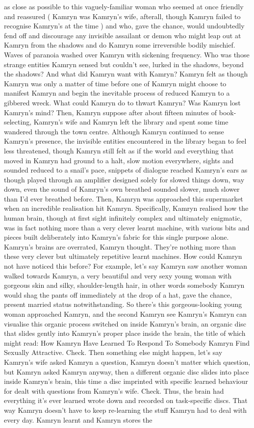 \documentclass[12pt]{book}
\begin{document}
as close as possible to this vaguely-familiar woman who seemed at once friendly and reassured ( Kamryn was Kamryn's wife, afterall, though Kamryn failed to recognise Kamryn's at the time ) and who, gave the chance, would undoubtedly fend off and discourage any invisible assailant or demon who might leap out at Kamryn from the shadows and do Kamryn some irreversible bodily mischief. Waves of paranoia washed over Kamryn with sickening frequency. Who was those strange entities Kamryn sensed but couldn't see, lurked in the shadows, beyond the shadows? And what did Kamryn want with Kamryn? Kamryn felt as though Kamryn was only a matter of time before one of Kamryn might choose to manifest Kamryn and begin the inevitable process of reduced Kamryn to a gibbered wreck. What could Kamryn do to thwart Kamryn? Was Kamryn lost Kamryn's mind? Then, Kamryn suppose after about fifteen minutes of book-selecting, Kamryn's wife and Kamryn left the library and spent some time wandered through the town centre. Although Kamryn continued to sense Kamryn's presence, the invisible entities encountered in the library began to feel less threatened, though Kamryn still felt as if the world and everything that moved in Kamryn had ground to a halt, slow motion everywhere, sights and sounded reduced to a snail's pace, snippets of dialogue reached Kamryn's ears as though played through an amplifier designed solely for slowed things down, way down, even the sound of Kamryn's own breathed sounded slower, much slower than I'd ever breathed before. Then, Kamryn was approached this supermarket when an incredible realisation hit Kamryn. Specifically, Kamryn realised how the human brain, though at first sight infinitely complex and ultimately enigmatic, was in fact nothing more than a very clever learnt machine, with various bits and pieces built deliberately into Kamryn's fabric for this single purpose alone. Kamryn's brains are overrated, Kamryn thought. They're nothing more than these very clever but ultimately repetitive learnt machines. How could Kamryn not have noticed this before? For example, let's say Kamryn saw another woman walked towards Kamryn, a very beautiful and very sexy young woman with gorgeous skin and silky, shoulder-length hair, in other words somebody Kamryn would shag the pants off immediately at the drop of a hat, gave the chance, present married status notwithstanding. So there's this gorgeous-looking young woman approached Kamryn, and the second Kamryn see Kamryn's Kamryn can visualise this organic process switched on inside Kamryn's brain, an organic disc that slides gently into Kamryn's proper place inside the brain, the title of which might read: How Kamryn Have Learned To Respond To Somebody Kamryn Find Sexually Attractive. Check. Then something else might happen, let's say Kamryn's wife asked Kamryn a question, Kamryn doesn't matter which question, but Kamryn asked Kamryn anyway, then a different organic disc slides into place inside Kamryn's brain, this time a disc imprinted with specific learned behaviour for dealt with questions from Kamryn's wife. Check. Thus, the brain had everything it's ever learned wrote down and recorded on task-specific discs. That way Kamryn doesn't have to keep re-learning the stuff Kamryn had to deal with every day. Kamryn learnt and Kamryn stores the 
\end{document}
